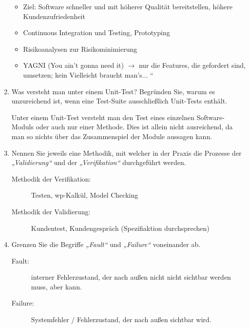 \documentclass{bschlangaul-aufgabe}
\begin{document}
\begin{enumerate}
\begin{liAntwort}
\begin{itemize}
\item Ziel: Software schneller und mit höherer Qualität bereitstellen,
höhere Kundenzufriedenheit

\item Continuous Integration und Testing, Prototyping

\item Risikoanalysen zur Risikominimierung

\item YAGNI (You ain’t gonna need it) $\rightarrow$ nur die Features,
die gefordert sind, umsetzen; kein Vielleicht braucht man’s... “
\end{itemize}
\end{liAntwort}

%

\item Was versteht man unter einem Unit-Test? Begründen
Sie, warum es unzureichend ist, wenn eine Test-Suite ausschließlich
Unit-Tests enthält.

\begin{liAntwort}
Unter einem Unit-Test versteht man den Test eines einzelnen
Software-Moduls oder auch nur einer Methode. Dies ist allein nicht
ausreichend, da man so nichts über das Zusammenspiel der Module aussagen
kann.
\end{liAntwort}

%

\item Nennen Sie jeweils eine Methodik, mit welcher in der Praxis die
Prozesse der \emph{„Validierung“} und der \emph{„Verifikation“}
durchgeführt werden.

\begin{liAntwort}
\begin{description}
\item[Methodik der Verifikation:]
Testen, wp-Kalkül, Model Checking

\item[Methodik der Validierung:]
Kundentest, Kundengespräch (Spezifiaktion durchsprechen)
\end{description}
\end{liAntwort}

%

\item Grenzen Sie die Begriffe \emph{„Fault“} und \emph{„Failure“}
voneinander ab.

\begin{liAntwort}

\begin{description}
\item[Fault:]
interner Fehlerzustand, der nach außen nicht nicht sichtbar werden muss,
aber kann.

\item[Failure:]
Systemfehler / Fehlerzustand, der nach außen sichtbar wird.
\end{description}
\end{liAntwort}
\end{enumerate}
\end{document}
